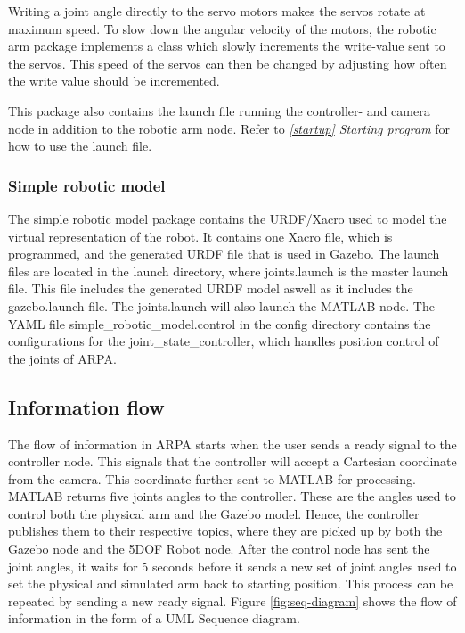 \documentclass[11pt,a4paper, titlepage]{article}
\begin{document}
Writing a joint angle directly to the servo motors makes the servos rotate at maximum speed. To slow down the angular velocity of the motors, the robotic arm package implements a class which slowly increments the write-value sent to the servos. This speed of the servos can then be changed by adjusting how often the write value should be incremented.

This package also contains the launch file running the controller- and camera node in addition to the robotic arm node. Refer to \textit{\ref{startup} Starting program} for how to use the launch file.
	

\subsubsection{Simple robotic model}
The simple robotic model package contains the URDF/Xacro used to model the virtual representation of the robot. It contains one Xacro file, which is programmed, and the generated URDF file that is used in Gazebo. The launch files are located in the launch directory, where joints.launch is the master launch file. This file includes the generated URDF model aswell as it includes the gazebo.launch file. The joints.launch will also launch the MATLAB node. The YAML file simple\_robotic\_model.control in the config directory contains the configurations for the joint\_state\_controller, which handles position control of the joints of ARPA.
	
\subsection{Information flow}
The flow of information in ARPA starts when the user sends a ready signal to the controller node. This signals that the controller will accept a Cartesian coordinate from the camera. This coordinate  further sent to MATLAB for processing. MATLAB returns five joints angles to the controller. These are the angles used to control both the physical arm and the Gazebo model. Hence, the controller publishes them to their respective topics, where they are picked up by both the Gazebo node and the 5DOF Robot node. After the control node has sent the joint angles, it waits for 5 seconds before it sends a new set of joint angles used to set the physical and simulated arm back to starting position. This process can be repeated by sending a new ready signal. Figure \ref{fig:seq-diagram} shows the flow of information in the form of a UML Sequence diagram.
	
\end{document}
